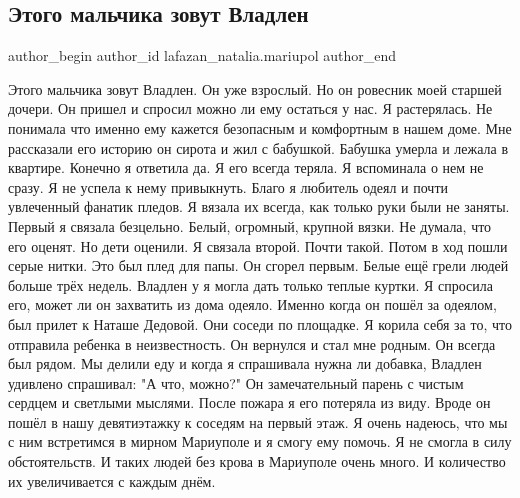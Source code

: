  
 
 
 
 

\subsection{Этого мальчика зовут Владлен}
\label{sec:31_03_2022.fb.lafazan_natalia.mariupol.1.malchik_vladlen}

\ifcmt
 author_begin
   author_id lafazan_natalia.mariupol
 author_end
\fi

Этого мальчика зовут Владлен. Он уже взрослый. Но он ровесник моей старшей
дочери. Он пришел и спросил можно ли ему остаться у нас. Я растерялась. Не
понимала что именно ему кажется безопасным и комфортным в нашем доме. Мне
рассказали его историю он сирота и жил с бабушкой. Бабушка умерла и лежала в
квартире. Конечно я ответила да. Я его всегда теряла. Я вспоминала о нем не
сразу. Я не успела к нему привыкнуть. Благо я любитель одеял и почти увлеченный
фанатик пледов. Я вязала их всегда, как только руки были не заняты. Первый я
связала безцельно. Белый, огромный, крупной вязки. Не думала, что его оценят.
Но дети оценили. Я связала второй. Почти такой. Потом в ход пошли серые нитки.
Это был плед для папы. Он сгорел первым. Белые ещё грели людей больше трёх
недель. Владлен у я могла дать только теплые куртки. Я спросила его, может ли
он захватить из дома одеяло. Именно когда он пошёл за одеялом, был прилет к
Наташе Дедовой. Они соседи по площадке. Я корила себя за то, что отправила
ребенка в неизвестность. Он вернулся и стал мне родным. Он всегда был рядом. Мы
делили еду и когда я спрашивала нужна ли добавка, Владлен удивлено спрашивал:
"А что, можно?" Он замечательный парень с чистым сердцем и светлыми мыслями.
После пожара я его потеряла из виду. Вроде он пошёл в нашу девятиэтажку к
соседям на первый этаж. Я очень надеюсь, что мы с ним встретимся в мирном
Мариуполе и я смогу ему помочь. Я не смогла в силу обстоятельств. И таких людей
без крова в Мариуполе очень много. И количество их увеличивается с каждым днём.

